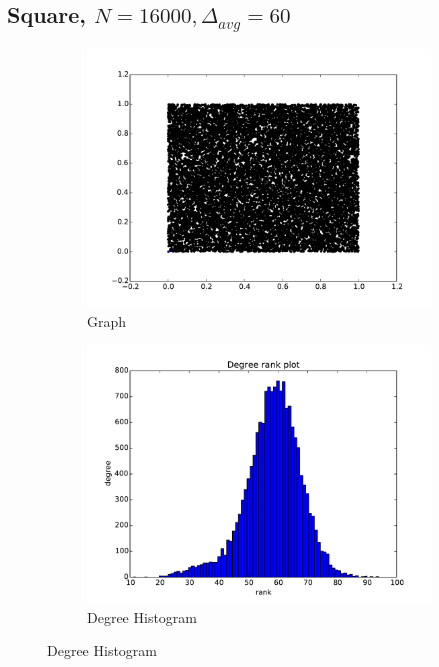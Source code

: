\documentclass[oneside, titlepage]{scrartcl}
\begin{document}
\subsection{Square, $N=16000, \Delta_{avg}=60$}
\begin{figure}[!h]
\centering
\begin{subfigure}{0.5\textwidth}
	\centering
	\includegraphics[width=0.9\linewidth]{figures/graph4.pdf}
	\caption{Graph}
\end{subfigure}%
\begin{subfigure}{0.5\textwidth}
	\centering
	\includegraphics[width=0.9\linewidth]{figures/degrees4.pdf}
	\caption{Degree Histogram}
\end{subfigure}


\end{figure}
\end{document}

